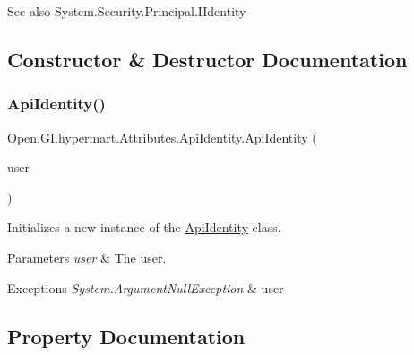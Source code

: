 \begin{DoxySeeAlso}{See also}
System.\+Security.\+Principal.\+I\+Identity


\end{DoxySeeAlso}


\subsection{Constructor \& Destructor Documentation}
\hypertarget{class_open_1_1_g_i_1_1hypermart_1_1_attributes_1_1_api_identity_a0ca1c38ef87fde2fb7b816fde06e6ebe}{}\label{class_open_1_1_g_i_1_1hypermart_1_1_attributes_1_1_api_identity_a0ca1c38ef87fde2fb7b816fde06e6ebe} 
\subsubsection{\texorpdfstring{Api\+Identity()}{ApiIdentity()}}
{\footnotesize\ttfamily Open.\+G\+I.\+hypermart.\+Attributes.\+Api\+Identity.\+Api\+Identity (\begin{DoxyParamCaption}\item[{\hyperlink{class_open_1_1_g_i_1_1hypermart_1_1_models_1_1_w_s_user}{W\+S\+User}}]{user }\end{DoxyParamCaption})}



Initializes a new instance of the \hyperlink{class_open_1_1_g_i_1_1hypermart_1_1_attributes_1_1_api_identity}{Api\+Identity} class. 


\begin{DoxyParams}{Parameters}
{\em user} & The user.\\
\hline
\end{DoxyParams}

\begin{DoxyExceptions}{Exceptions}
{\em System.\+Argument\+Null\+Exception} & user\\
\hline
\end{DoxyExceptions}


\subsection{Property Documentation}
\hypertarget{class_open_1_1_g_i_1_1hypermart_1_1_attributes_1_1_api_identity_aa3d5a607ebaae15ce9b20556fb633fab}{}\label{class_open_1_1_g_i_1_1hypermart_1_1_attributes_1_1_api_identity_aa3d5a607ebaae15ce9b20556fb633fab} 
